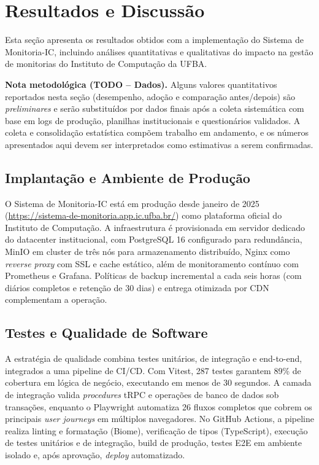 \documentclass[portuguese]{sbc2025}%
\begin{document}
\section{Resultados e Discussão}
\label{sec:results}

Esta seção apresenta os resultados obtidos com a implementação do Sistema de Monitoria-IC, incluindo análises quantitativas e qualitativas do impacto na gestão de monitorias do Instituto de Computação da UFBA.

\medskip
\noindent\textbf{Nota metodológica (TODO – Dados).} Alguns valores quantitativos reportados nesta seção (desempenho, adoção e comparação antes/depois) são \textit{preliminares} e serão substituídos por dados finais após a coleta sistemática com base em logs de produção, planilhas institucionais e questionários validados. A coleta e consolidação estatística compõem trabalho em andamento, e os números apresentados aqui devem ser interpretados como estimativas a serem confirmadas.

\subsection{Implantação e Ambiente de Produção}

O Sistema de Monitoria-IC está em produção desde janeiro de 2025 (\url{https://sistema-de-monitoria.app.ic.ufba.br/}) como plataforma oficial do Instituto de Computação. A infraestrutura é provisionada em servidor dedicado do datacenter institucional, com PostgreSQL 16 configurado para redundância, MinIO em cluster de três nós para armazenamento distribuído, Nginx como \textit{reverse proxy} com SSL e cache estático, além de monitoramento contínuo com Prometheus e Grafana. Políticas de backup incremental a cada seis horas (com diários completos e retenção de 30 dias) e entrega otimizada por CDN complementam a operação.

\subsection{Testes e Qualidade de Software}

A estratégia de qualidade combina testes unitários, de integração e end-to-end, integrados a uma pipeline de CI/CD. Com Vitest, 287 testes garantem 89\% de cobertura em lógica de negócio, executando em menos de 30 segundos. A camada de integração valida \textit{procedures} tRPC e operações de banco de dados sob transações, enquanto o Playwright automatiza 26 fluxos completos que cobrem os principais \textit{user journeys} em múltiplos navegadores. No GitHub Actions, a pipeline realiza linting e formatação (Biome), verificação de tipos (TypeScript), execução de testes unitários e de integração, build de produção, testes E2E em ambiente isolado e, após aprovação, \textit{deploy} automatizado.
\end{document}
